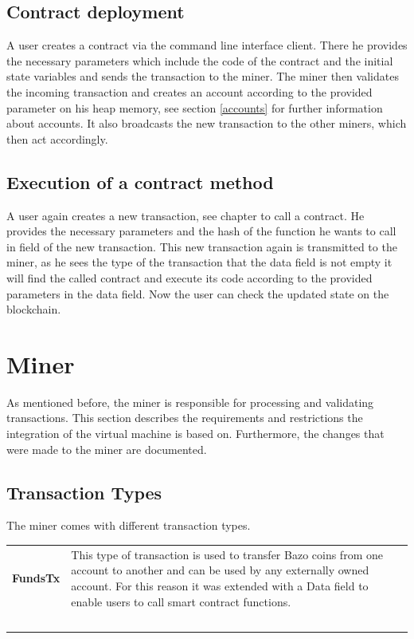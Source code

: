\subsection{Contract deployment}
A user creates a contract via the command line interface client. There he provides the necessary parameters which include the code of the contract and the initial state variables and sends the transaction to the miner. The miner then validates the incoming transaction and creates an account according to the provided parameter on his heap memory, see section \ref{accounts} for further information about accounts. It also broadcasts the new transaction to the other miners, which then act accordingly.

\subsection{Execution of a contract method}
A user again creates a new transaction, see chapter to call a contract. He provides the necessary parameters and the hash of the function he wants to call in field of the new transaction. This new transaction again is transmitted to the miner, as he sees the type of the transaction that the data field is not empty it will find the called contract and execute its code according to the provided parameters in the data field. Now the user can check the updated state on the blockchain. 
\pagebreak

\section{Miner} \label{design_miner}
As mentioned before, the miner is responsible for processing and validating transactions. This section describes the requirements and restrictions the integration of the virtual machine is based on. Furthermore, the changes that were made to the miner are documented.

\subsection{Transaction Types} \label{transactionTypes}
The miner comes with different transaction types. 

\begin{tabular}[t]{ p{3cm} p{12.5cm}}
\raggedright
\textbf{FundsTx} &
This type of transaction is used to transfer Bazo coins from one account to another and can be used by any externally owned account.\cite{ba_miner} For this reason it was extended with a Data field to enable users to call smart contract functions.
\\ \\
\end{tabular}

